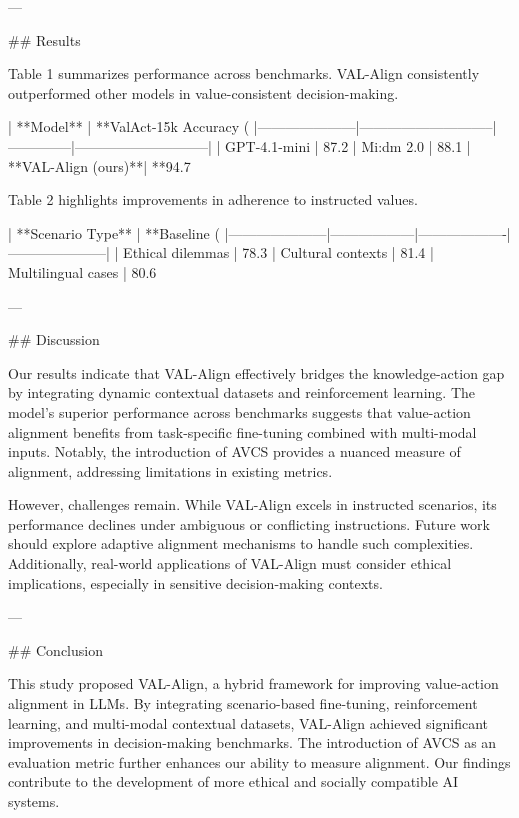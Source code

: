 ---

## Results  

Table 1 summarizes performance across benchmarks. VAL-Align consistently outperformed other models in value-consistent decision-making.  

| **Model**          | **ValAct-15k Accuracy (%
|---------------------|-----------------------------|--------------|-----------------------------|  
| GPT-4.1-mini        | 87.2%
| Mi:dm 2.0           | 88.1%
| **VAL-Align (ours)**| **94.7%

Table 2 highlights improvements in adherence to instructed values.  

| **Scenario Type**   | **Baseline (%
|---------------------|------------------|-------------------|---------------------|  
| Ethical dilemmas    | 78.3%
| Cultural contexts   | 81.4%
| Multilingual cases  | 80.6%

---

## Discussion  

Our results indicate that VAL-Align effectively bridges the knowledge-action gap by integrating dynamic contextual datasets and reinforcement learning. The model's superior performance across benchmarks suggests that value-action alignment benefits from task-specific fine-tuning combined with multi-modal inputs. Notably, the introduction of AVCS provides a nuanced measure of alignment, addressing limitations in existing metrics.  

However, challenges remain. While VAL-Align excels in instructed scenarios, its performance declines under ambiguous or conflicting instructions. Future work should explore adaptive alignment mechanisms to handle such complexities. Additionally, real-world applications of VAL-Align must consider ethical implications, especially in sensitive decision-making contexts.

---

## Conclusion  

This study proposed VAL-Align, a hybrid framework for improving value-action alignment in LLMs. By integrating scenario-based fine-tuning, reinforcement learning, and multi-modal contextual datasets, VAL-Align achieved significant improvements in decision-making benchmarks. The introduction of AVCS as an evaluation metric further enhances our ability to measure alignment. Our findings contribute to the development of more ethical and socially compatible AI systems.

